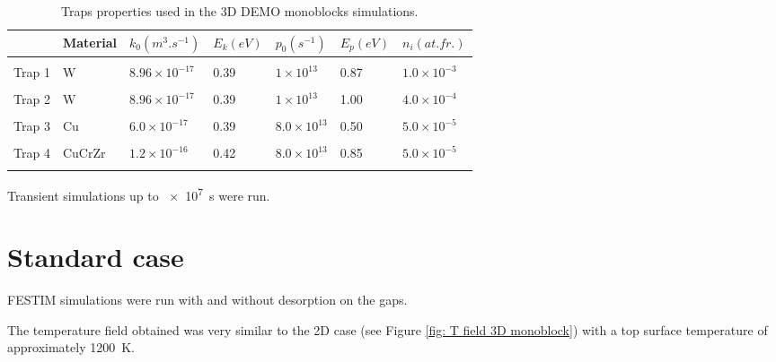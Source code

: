 \begin{table}
    \centering
    \begin{tabular}{L{1.5cm} L{1.5cm} R{1.6cm} R{1.1cm} R{1.6cm} R{1.1cm} R{2cm}}
         & Material & $k_0 (\si{m^3.s^{-1}})$ &  $E_k (\si{eV})$ & $p_0 (\si{s^{-1}})$ & $E_p (\si{eV})$ & $n_i (\si{at.fr.})$ \\
        \hline
        \\
        Trap 1 & W & $8.96 \times 10^{-17}$ & 0.39 & $1 \times 10^{13}$& 0.87 & $1.0 \times 10^{-3}$ \\
        \\
        Trap 2 & W & $8.96 \times 10^{-17}$ & 0.39 & $1 \times 10^{13}$& 1.00 & $4.0 \times 10^{-4}$ \\
        \\
        Trap 3 & Cu & $6.0 \times 10^{-17}$ & 0.39 & $8.0 \times 10^{13}$ & 0.50 &$5.0 \times 10^{-5}$\\
        \\
        Trap 4 & CuCrZr & $1.2\times 10^{-16}$ & 0.42 & $8.0 \times 10^{13}$ & 0.85 &$5.0 \times 10^{-5}$\\
        \\
    \end{tabular}
    \caption{Traps properties used in the 3D DEMO monoblocks simulations.}
    \label{tab:traps monoblock DEMO}
\end{table}

Transient simulations up to \SI{e7}{s} were run.

\section{Standard case}

FESTIM simulations were run with and without desorption on the gaps.


The temperature field obtained was very similar to the 2D case (see Figure \ref{fig: T field 3D monoblock}) with a top surface temperature of approximately \SI{1200}{K}.

